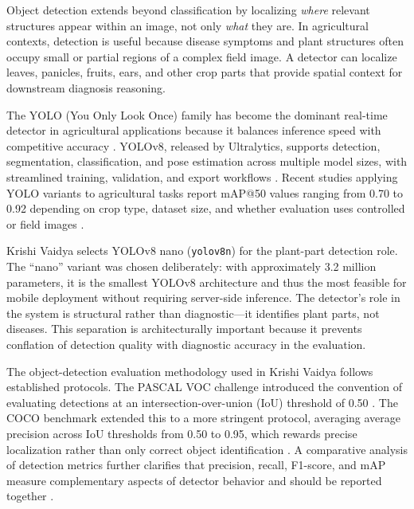 

Object detection extends beyond classification by localizing \emph{where} relevant structures
appear within an image, not only \emph{what} they are. In agricultural contexts, detection is
useful because disease symptoms and plant structures often occupy small or partial regions of
a complex field image. A detector can localize leaves, panicles, fruits, ears, and other
crop parts that provide spatial context for downstream diagnosis reasoning.

The YOLO (You Only Look Once) family has become the dominant real-time detector in agricultural
applications because it balances inference speed with competitive accuracy
\parencite{jiangYOLOSurvey2022}. YOLOv8, released by Ultralytics, supports detection,
segmentation, classification, and pose estimation across multiple model sizes, with streamlined
training, validation, and export workflows \parencite{ultralyticsYolov8}. Recent studies
applying YOLO variants to agricultural tasks report mAP@50 values ranging from 0.70 to 0.92
depending on crop type, dataset size, and whether evaluation uses controlled or field images
\parencite{tian2020AppleFruitYOLO,zhengSmallObjDetAgri2023}.

Krishi Vaidya selects YOLOv8 nano (\texttt{yolov8n}) for the plant-part detection role. The
``nano'' variant was chosen deliberately: with approximately 3.2 million parameters, it is
the smallest YOLOv8 architecture and thus the most feasible for mobile deployment without
requiring server-side inference. The detector's role in the system is structural rather than
diagnostic---it identifies plant parts, not diseases. This separation is architecturally
important because it prevents conflation of detection quality with diagnostic accuracy in
the evaluation.


The object-detection evaluation methodology used in Krishi Vaidya follows established protocols.
The PASCAL VOC challenge introduced the convention of evaluating detections at an intersection-over-union (IoU) threshold of 0.50 \parencite{everinghamPASCALVOC2010}. The
COCO benchmark extended this to a more stringent protocol, averaging average precision across
IoU thresholds from 0.50 to 0.95, which rewards precise localization rather than only correct
object identification \parencite{linCOCO2014}. A comparative analysis of detection metrics
further clarifies that precision, recall, F1-score, and mAP measure complementary aspects of
detector behavior and should be reported together \parencite{padillaMetricsSurvey2021}.

